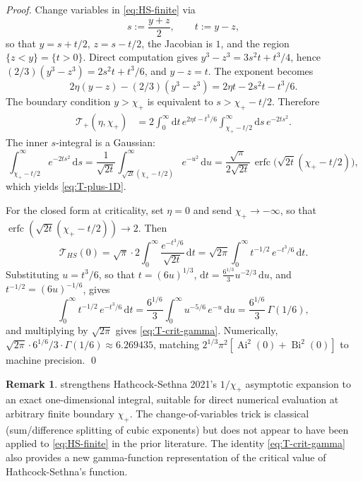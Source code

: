 \documentclass[11pt,a4paper]{article}
\theoremstyle{plain}
\theoremstyle{definition}
\newtheorem{remark}[theorem]{Remark}
\renewcommand{\d}{\mathrm{d}}
\newcommand{\Ai}{\operatorname{Ai}}
\newcommand{\Bi}{\operatorname{Bi}}
\begin{document}
\begin{proof}
Change variables in \eqref{eq:HS-finite} via
$$ s := \frac{y+z}{2},\qquad t := y-z,$$
so that $y = s + t/2$, $z = s - t/2$, the Jacobian is $1$, and the region $\{z < y\} = \{t > 0\}$. Direct computation gives $y^3 - z^3 = 3s^2 t + t^3/4$, hence $(2/3)(y^3 - z^3) = 2s^2 t + t^3/6$, and $y - z = t$. The exponent becomes
$$ 2\eta(y - z) - (2/3)(y^3 - z^3) = 2\eta t - 2s^2 t - t^3/6.$$
The boundary condition $y > \chi_+$ is equivalent to $s > \chi_+ - t/2$. Therefore
\begin{align*}
\mathcal T_+(\eta,\chi_+) &= 2\int_0^\infty \d t\,e^{2\eta t - t^3/6}\int_{\chi_+ - t/2}^\infty \d s\,e^{-2ts^2}.
\end{align*}
The inner $s$-integral is a Gaussian:
$$ \int_{\chi_+ - t/2}^\infty e^{-2ts^2}\,\d s = \frac{1}{\sqrt{2t}}\int_{\sqrt{2t}(\chi_+ - t/2)}^\infty e^{-u^2}\,\d u = \frac{\sqrt\pi}{2\sqrt{2t}}\,\operatorname{erfc}\!\big(\sqrt{2t}(\chi_+ - t/2)\big),$$
which yields \eqref{eq:T-plus-1D}.

For the closed form at criticality, set $\eta = 0$ and send $\chi_+\to-\infty$, so that $\operatorname{erfc}(\sqrt{2t}(\chi_+ - t/2)) \to 2$. Then
$$ \mathcal T_{HS}(0) = \sqrt\pi\cdot 2\int_0^\infty\frac{e^{-t^3/6}}{\sqrt{2t}}\,\d t = \sqrt{2\pi}\int_0^\infty t^{-1/2}\,e^{-t^3/6}\,\d t.$$
Substituting $u = t^3/6$, so that $t = (6u)^{1/3}$, $\d t = \frac{6^{1/3}}{3}u^{-2/3}\,\d u$, and $t^{-1/2} = (6u)^{-1/6}$, gives
$$ \int_0^\infty t^{-1/2}\,e^{-t^3/6}\,\d t = \frac{6^{1/6}}{3}\int_0^\infty u^{-5/6}\,e^{-u}\,\d u = \frac{6^{1/6}}{3}\,\Gamma(1/6),$$
and multiplying by $\sqrt{2\pi}$ gives \eqref{eq:T-crit-gamma}. Numerically, $\sqrt{2\pi}\cdot 6^{1/6}/3\cdot\Gamma(1/6) \approx 6.269435$, matching $2^{1/3}\pi^2[\Ai^2(0)+\Bi^2(0)]$ to machine precision.
\qed
\end{proof}

\begin{remark}
 strengthens Hathcock-Sethna 2021's $1/\chi_+$ asymptotic expansion to an exact one-dimensional integral, suitable for direct numerical evaluation at arbitrary finite boundary $\chi_+$. The change-of-variables trick is classical (sum/difference splitting of cubic exponents) but does not appear to have been applied to \eqref{eq:HS-finite} in the prior literature. The identity \eqref{eq:T-crit-gamma} also provides a new gamma-function representation of the critical value of Hathcock-Sethna's function.
\end{remark}
\end{document}
